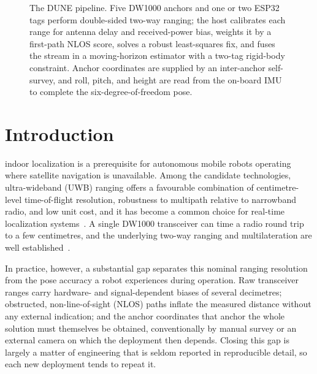 \begin{figure}[t]
  \caption{The DUNE pipeline. Five DW1000 anchors and one or two ESP32
  tags perform double-sided two-way ranging; the host calibrates each
  range for antenna delay and received-power bias, weights it by a
  first-path NLOS score, solves a robust least-squares fix, and fuses
  the stream in a moving-horizon estimator with a two-tag rigid-body
  constraint. Anchor coordinates are supplied by an inter-anchor
  self-survey, and roll, pitch, and height are read from the on-board
  IMU to complete the six-degree-of-freedom pose.}
  \label{fig:pipeline}
\end{figure}

\section{Introduction}
\label{sec:intro}

 indoor localization is a prerequisite for
autonomous mobile robots operating where satellite navigation is
unavailable. Among the candidate technologies, ultra-wideband (UWB)
ranging offers a favourable combination of centimetre-level time-of-flight
resolution, robustness to multipath relative to narrowband radio, and
low unit cost, and it has become a common choice for real-time
localization systems~\cite{alarifi2016uwb}. A single DW1000 transceiver
can time a radio round trip to a few centimetres, and the underlying
two-way ranging and multilateration are well established~\cite{dstwr_neirynck}.

In practice, however, a substantial gap separates this nominal ranging
resolution from the pose accuracy a robot experiences during operation.
Raw transceiver ranges carry hardware- and signal-dependent biases of
several decimetres; obstructed, non-line-of-sight (NLOS) paths inflate
the measured distance without any external indication; and the anchor
coordinates that anchor the whole solution must themselves be obtained,
conventionally by manual survey or an external camera on which the
deployment then depends. Closing this gap is largely a matter of
engineering that is seldom reported in reproducible detail, so each new
deployment tends to repeat it.

